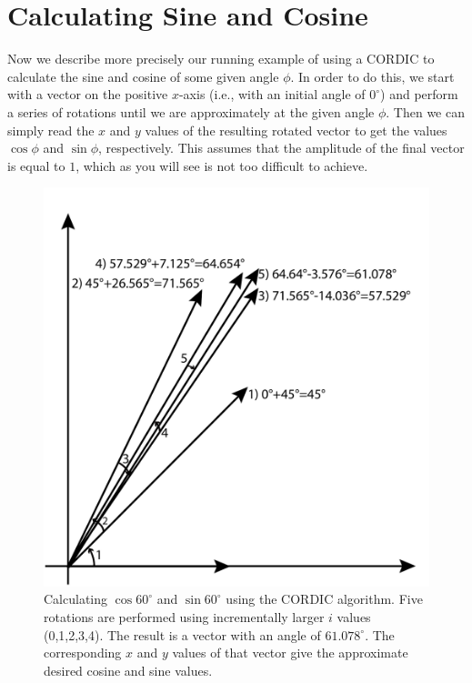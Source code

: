 \section{Calculating Sine and Cosine}

Now we describe more precisely our running example of using a CORDIC to calculate the sine and cosine of some given angle $\phi$. In order to do this, we start with a vector on the positive $x$-axis (i.e., with an initial angle of $0^{\circ}$) and perform a series of rotations until we are approximately at the given angle $\phi$. Then we can simply read the $x$ and $y$ values of the resulting rotated vector to get the values $\cos \phi$ and $\sin \phi$, respectively. This assumes that the amplitude of the final vector is equal to $1$, which as you will see is not too difficult to achieve.

\begin{figure}
\centering
\includegraphics[width=.5\textwidth]{images/sin_cos_cordic}
\caption{Calculating $\cos 60^{\circ}$ and $\sin 60^{\circ}$ using the CORDIC algorithm. Five rotations are performed using incrementally larger $i$ values (0,1,2,3,4). The result is a vector with an angle of $61.078^{\circ}$. The corresponding $x$ and $y$ values of that vector give the approximate desired cosine and sine values. }
\label{fig:cordic_rotations}
\end{figure}

